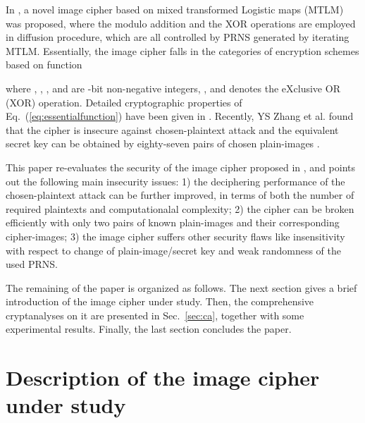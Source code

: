 \documentclass{ws-ijbc}
\begin{document}
In \cite{Sam:TLM:MTA2012}, a novel image cipher based on
mixed transformed Logistic maps (MTLM) was proposed, where
the modulo addition and the XOR operations
are employed in diffusion procedure, which are all controlled by
PRNS generated by iterating MTLM. Essentially, the image cipher falls in the categories of encryption schemes based on function

where , , , and  are -bit non-negative integers,
, and  denotes
the eXclusive OR (XOR) operation. Detailed cryptographic properties of Eq.~(\ref{eq:essentialfunction}) have been given in \cite{Cqli:breakmodulo:IJBC13}.
Recently, YS Zhang et al. found that the cipher is insecure against
chosen-plaintext attack and the equivalent secret key
can be obtained by eighty-seven pairs of
chosen plain-images \cite{Zhang:Cryptanalyzing:MTA2014}.

This paper re-evaluates the security of the image cipher proposed
in \cite{Sam:TLM:MTA2012}, and points out the following main insecurity issues:
1) the deciphering performance
of the chosen-plaintext attack can be further
improved, in terms of both the number of required plaintexts and computationalal complexity;
2) the cipher can be broken efficiently with only two pairs of
known plain-images and their corresponding cipher-images;  3) the image cipher suffers other security flaws like insensitivity with respect to change of plain-image/secret key and weak randomness of the used PRNS.

The remaining of the paper is organized as follows. The next section gives a brief introduction of the image
cipher under study. Then, the comprehensive cryptanalyses on it are presented in Sec.~\ref{sec:ca},
together with some experimental results. Finally, the last section concludes the paper.

\section{Description of the image cipher under study}
\label{sec:alogrithm}
\end{document}

